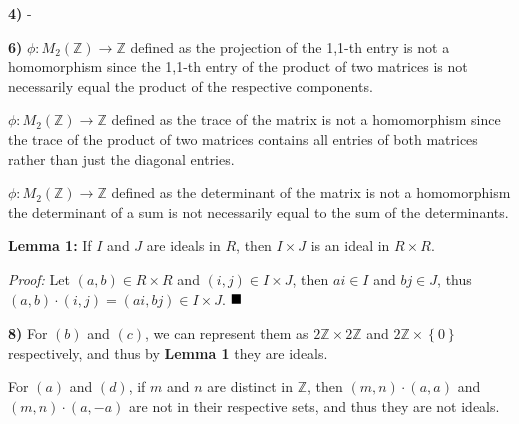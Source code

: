 \documentclass[12pt]{article}
\newcommand{\Z}{\mathbb{Z}}
\newcommand{\braceb}[1]{\left\{#1\right\}}
\newcommand{\proof}{\textit{Proof: }}
\newcommand{\done}{\ensuremath{\strut\hfill\blacksquare}}
\begin{document}
\textbf{4)} -

\textbf{6)}
\( \phi : M_2(\Z) \to \Z \) defined as the projection of the 1,1-th entry is
not a homomorphism since the 1,1-th entry of the product of two matrices is not
necessarily equal the product of the respective components.

\( \phi : M_2(\Z) \to \Z \) defined as the trace of the matrix is not a
homomorphism since the trace of the product of two matrices contains all
entries of both matrices rather than just the diagonal entries.

\( \phi : M_2(\Z) \to \Z \) defined as the determinant of the matrix is not a
homomorphism the determinant of a sum is not necessarily equal to the sum of
the determinants.

\textbf{Lemma 1:}
If \( I \) and \( J \) are ideals in \( R \), then \( I \times J \) is an ideal
in \( R \times R \).

\proof
Let \( (a, b) \in R \times R \) and \( (i, j) \in I \times J \), then
\( ai \in I \) and \( bj \in J \), thus
\( (a, b) \cdot (i, j) = (ai, bj) \in I \times J \).
\done

\textbf{8)}
For \( (b) \) and \( (c) \), we can represent them as \( 2\Z \times 2\Z \) and
\( 2\Z \times \braceb{0} \) respectively, and thus by \textbf{Lemma 1} they are
ideals.

For \( (a) \) and \( (d) \), if \( m \) and \( n \) are distinct in \( \Z \),
then \( (m, n) \cdot (a, a) \) and \( (m, n) \cdot (a, -a) \) are not in their
respective sets, and thus they are not ideals.
\end{document}
